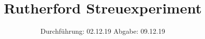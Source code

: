 

\subject{V16}
\title{Rutherford Streuexperiment}
\date{
  Durchführung: 02.12.19
  \hspace{3em}
  Abgabe: 09.12.19
}



\maketitle
\thispagestyle{empty}
\tableofcontents
\newpage



\newpage

%
\newpage



\newpage
\printbibliography


